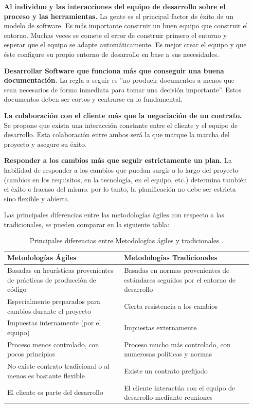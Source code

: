 \begin{description}
\item \textbf{Al individuo y las interacciones del equipo de desarrollo sobre el proceso y las herramientas.} La gente es el principal factor de éxito de un modelo de software. Es más importante construir un buen equipo que construir el entorno. Muchas veces se comete el error de construir primero el entorno y esperar que el equipo se adapte automáticamente. Es mejor crear el equipo y que éste configure su propio entorno de desarrollo en base a sus necesidades.
\item \textbf{Desarrollar Software que funciona más que conseguir una buena documentación.} La regla a seguir es ''no producir documentos a menos que sean necesarios de forma inmediata para tomar una decisión importante''. Estos documentos deben ser cortos y centrarse en lo fundamental.

\item \textbf{La colaboración con el cliente más que la negociación de un contrato.} Se propone que exista una interacción constante entre el cliente y el equipo de desarrollo. Esta colaboración entre ambos será la que marque la marcha del proyecto y asegure su éxito.
\item \textbf{Responder a los cambios más que seguir estrictamente un plan.} La habilidad de responder a los cambios que puedan surgir a lo largo del proyecto (cambios en los requisitos, en la tecnología, en el equipo, etc.) determina también el éxito o fracaso del mismo. por lo tanto, la planificación no debe ser estricta sino flexible y abierta.
\end{description}

Las principales diferencias entre las metodologías ágiles con respecto a las tradicionales, se pueden comparar en la siguiente tabla: 

\begin{table}[H]
 \centering
 \begin{tabular}{|p{6cm}|p{6cm}|}
 \hline
 \textbf{Metodologías Ágiles} & \textbf{Metodologías Tradicionales} \\
 \hline
Basadas en heurísticas provenientes de prácticas de producción de código & Basadas en normas provenientes de estándares seguidos por el entorno de desarrollo\\
 \hline
Especialmente preparados para cambios durante el proyecto & Cierta resistencia a los cambios\\
\hline
Impuestas internamente (por el equipo) & Impuestas externamente\\
\hline
Proceso menos controlado, con pocos principios &Proceso mucho más controlado, con numerosas políticas y normas\\
\hline
No existe contrato tradicional o al menos es bastante flexible & Existe un contrato prefijado\\
\hline
El cliente es parte del desarrollo & El cliente interactúa con el equipo de desarrollo mediante reuniones\\
\hline
 \end{tabular}
 \caption{Principales diferencias entre Metodologías ágiles y tradicionales \parencite{canos2012}.}
\end{table}

